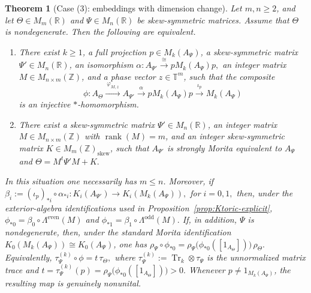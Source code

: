 \documentclass[11pt]{amsart}
\newtheorem{theorem}{Theorem}[section]
\theoremstyle{definition}
\theoremstyle{remark}
\newcommand{\T}{\mathbb{T}}
\newcommand{\Z}{\mathbb{Z}}
\newcommand{\R}{\mathbb{R}}
\begin{document}
\begin{theorem}[Case (3): embeddings with dimension change]
\label{thm:case3-explicit}
Let $m,n\geq 2$, and let
$\Theta\in M_m(\R)$ and $\Psi\in M_n(\R)$ be skew-symmetric matrices.
Assume that $\Theta$ is nondegenerate. Then the following are equivalent.

\begin{enumerate}[label=\textup{(\roman*)}]
\item There exist $k\geq 1$, a full projection
$p\in M_k(A_\Psi)$, a skew-symmetric matrix $\Psi'\in M_n(\R)$, an isomorphism $\alpha\colon A_{\Psi'}\xrightarrow{\cong}pM_k(A_\Psi)p,$
an integer matrix $M\in M_{n\times m}(\Z)$, and a phase vector
$z\in\T^m$, such that the composite
\[
\phi\colon
A_\Theta
\xrightarrow{\ \varphi_{M,z}\ }
A_{\Psi'}
\xrightarrow{\ \alpha\ }
pM_k(A_\Psi)p
\xrightarrow{\ \iota_p\ }
M_k(A_\Psi)
\]
is an injective $*$-homomorphism.

\item There exist a skew-symmetric matrix $\Psi'\in M_n(\R)$, an integer
matrix $M\in M_{n\times m}(\Z)$ with $\operatorname{rank}(M)=m$, and an
integer skew-symmetric matrix $K\in M_m(\Z)_{\mathrm{skew}}$, such that
$A_{\Psi'}$ is strongly Morita equivalent to $A_\Psi$ and $\Theta=M^t\Psi'M+K.$
\end{enumerate}

In this situation one necessarily has $m\leq n$. Moreover, if $\beta_i:=(\iota_p)_{*i}\circ\alpha_{*i}\colon K_i(A_{\Psi'})\longrightarrow K_i(M_k(A_\Psi)),$ for $i=0,1,$
then, under the exterior-algebra identifications used in
Proposition~\ref{prop:Ktoric-explicit}, $\phi_{*0}=\beta_0\circ\Lambda^{\mathrm{even}}(M)$ and $\phi_{*1}
=\beta_1\circ\Lambda^{\mathrm{odd}}(M).$ If, in addition, $\Psi$ is nondegenerate, then, under the standard Morita
identification $K_0(M_k(A_\Psi))\cong K_0(A_\Psi)$, one has $\rho_\Psi\circ\phi_{*0}
=
\rho_\Psi\bigl(\phi_{*0}([1_{A_\Theta}])\bigr)\,\rho_\Theta.$
Equivalently, $\tau_\Psi^{(k)}\circ\phi=t\,\tau_\Theta,$
where $\tau_\Psi^{(k)}:=\operatorname{Tr}_k\otimes\tau_\Psi$
is the unnormalized matrix trace and $t=\tau_\Psi^{(k)}(p)=\rho_\Psi\bigl(\phi_{*0}([1_{A_\Theta}])\bigr)>0.$
Whenever $p\neq 1_{M_k(A_\Psi)}$, the resulting map is genuinely nonunital.
\end{theorem}
\end{document}
